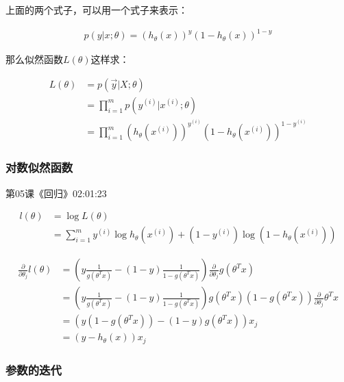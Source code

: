 \documentclass[UTF8]{ctexart}
\begin{document}
上面的两个式子，可以用一个式子来表示：

 \begin{equation}
\begin{aligned}
p(y|x;\theta)=(h_{\theta}(x))^{y}(1-h_{\theta}(x))^{1-y}
\end{aligned}
\end{equation}

那么似然函数$L(\theta)$这样求：

\begin{equation}
\begin{aligned}
L(\theta)&=p(\vec{y}|X;\theta)\\
&=\prod_{i=1}^{m}p(y^{(i)}|x^{(i)};\theta)\\
&=\prod_{i=1}^{m}(h_{\theta}(x^{(i)}))^{y^{(i)}}(1-h_{\theta}(x^{(i)}))^{1-y^{(i)}}
\end{aligned}
\end{equation}

\subsubsection{对数似然函数}

第05课《回归》02:01:23

\begin{equation}
\begin{aligned}
l(\theta) &= \log L(\theta) \\
&= \sum_{i=1}^{m} y^{(i)}\log h_{\theta}(x^{(i)}) + (1-y^{(i)}) \log (1-h_{\theta}(x^{(i)}))
\end{aligned}
\end{equation}

\begin{equation}
\begin{aligned}
\frac{\partial}{\partial \theta_{j}} l(\theta) &= (y \frac{1}{g(\theta^{T} x)} - (1-y) \frac{1}{1-g(\theta^{T} x)}) \frac{\partial}{\partial \theta_{j}} g(\theta^{T} x)\\
&=  (y \frac{1}{g(\theta^{T} x)} - (1-y) \frac{1}{1-g(\theta^{T} x)}) g(\theta^{T} x)(1-g(\theta^{T} x))\frac{\partial}{\partial \theta_{j}} \theta^{T}x \\
&= (y(1-g(\theta^{T} x))-(1-y)g(\theta^{T} x))x_{j}\\
&= (y-h_{\theta}(x))x_{j}
\end{aligned}
\end{equation}

\subsubsection{参数的迭代}
\end{document}
